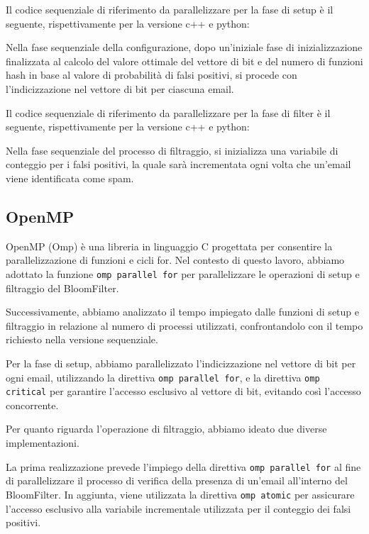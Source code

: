 Il codice sequenziale di riferimento da parallelizzare per la fase di setup è il seguente, rispettivamente per la versione c++ e python:



Nella fase sequenziale della configurazione, dopo un'iniziale fase di inizializzazione finalizzata al calcolo del valore
ottimale del vettore di bit e del numero di funzioni hash in base al valore di probabilità di falsi positivi,
si procede con l'indicizzazione nel vettore di bit per ciascuna email.

Il codice sequenziale di riferimento da parallelizzare per la fase di filter è il seguente, rispettivamente per la versione c++ e python:



Nella fase sequenziale del processo di filtraggio, si inizializza una variabile di conteggio per i
falsi positivi, la quale sarà incrementata ogni volta che un'email viene identificata come spam.

\subsection{OpenMP}\label{subsec:omp}
OpenMP (Omp) è una libreria in linguaggio C progettata per consentire la parallelizzazione di funzioni e cicli for.
Nel contesto di questo lavoro, abbiamo adottato la funzione \texttt{omp parallel for} per parallelizzare le operazioni
di setup e filtraggio del BloomFilter.

Successivamente, abbiamo analizzato il tempo impiegato dalle funzioni di setup e filtraggio in relazione al numero
di processi utilizzati, confrontandolo con il tempo richiesto nella versione sequenziale.

Per la fase di setup, abbiamo parallelizzato l'indicizzazione nel vettore di bit per ogni email, utilizzando la direttiva \texttt{omp parallel for},
e la direttiva \texttt{omp critical} per garantire l'accesso esclusivo al vettore di bit, evitando così l'accesso concorrente.

Per quanto riguarda l'operazione di filtraggio, abbiamo ideato due diverse implementazioni.

La prima realizzazione prevede l'impiego della direttiva \texttt{omp parallel for} al fine di parallelizzare il processo
di verifica della presenza di un'email all'interno del BloomFilter.
In aggiunta, viene utilizzata la direttiva \texttt{omp atomic} per assicurare l'accesso esclusivo alla variabile
incrementale utilizzata per il conteggio dei falsi positivi.

